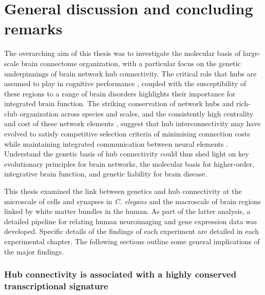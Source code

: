 \chapter{General discussion and concluding remarks}
\label{ch:Discussion}

The overarching aim of this thesis was to investigate the molecular basis of large-scale brain connectome organization, with a particular focus on the genetic underpinnings of brain network hub connectivity. The critical role that hubs are assumed to play in cognitive performance \citep{Buckner2009,Mesulam1998}, coupled with the susceptibility of these regions to a range of brain disorders \citep{Bassett2009a,Crossley2014,Fornito2015} highlights their importance for integrated brain function. The striking conservation of network hubs and rich-club organization across species and scales, and the consistently high centrality and cost of these network elements \citep{VandenHeuvel2016}, suggest that hub interconnectivity may have evolved to satisfy competitive selection criteria of minimising connection costs while maintaining integrated communication between neural elements \citep{Bullmore2012}. Understand the genetic basis of hub connectivity could thus shed light on key evolutionary principles for brain networks, the molecular basis for higher-order, integrative brain function, and genetic liability for brain disease. 

This thesis examined the link between genetics and hub connectivity at the microscale of cells and synapses in \textit{C. elegans} and the macroscale of brain regions linked by white matter bundles in the human. As part of the latter analysis, a detailed pipeline for relating human neuroimaging and gene expression data was developed. Specific details of the findings of each experiment are detailed in each experimental chapter. The following sections outline some general implications of the major findings. 

\subsection*{Hub connectivity is associated with a highly conserved transcriptional signature}

